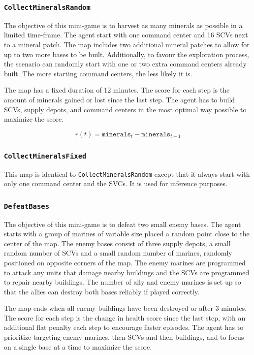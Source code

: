 \subsubsection*{\texttt{CollectMineralsRandom}}

The objective of this mini-game is to harvest as many minerals as possible in a limited time-frame. The agent start with one command center and 16 SCVs next to a mineral patch. The map includes two additional mineral patches to allow for up to two more bases to be built. Additionally, to favour the exploration process, the scenario can randomly start with one or two extra command centers already built. The more starting command centers, the less likely it is.

The map has a fixed duration of 12 minutes. The score for each step is the amount of minerals gained or lost since the last step. The agent has to build SCVs, supply depots, and command centers in the most optimal way possible to maximize the score.

$$
r(t) = \texttt{minerals}_{t} - \texttt{minerals}_{t-1}
$$

\subsubsection*{\texttt{CollectMineralsFixed}}

This map is identical to \texttt{CollectMineralsRandom} except that it always start with only one command center and the SVCs. It is used for inference purposes.

\subsubsection*{\texttt{DefeatBases}}

The objective of this mini-game is to defeat two small enemy bases. The agent starts with a group of marines of variable size placed a random point close to the center of the map. The enemy bases consist of three supply depots, a small random number of SCVs and a small random number of marines, randomly positioned on opposite corners of the map. The enemy marines are programmed to attack any units that damage nearby buildings and the SCVs are programmed to repair nearby buildings. The number of ally and enemy marines is set up so that the allies can destroy both bases reliably if played correctly.

The map ends when all enemy buildings have been destroyed or after 3 minutes. The score for each step is the change in health score since the last step, with an additional flat penalty each step to encourage faster episodes. The agent has to prioritize targeting enemy marines, then SCVs and then buildings, and to focus on a single base at a time to maximize the score.

